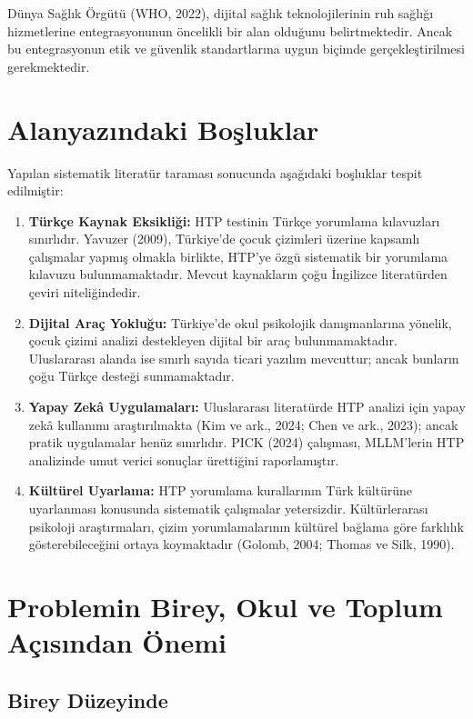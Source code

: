 Dünya Sağlık Örgütü (WHO, 2022), dijital sağlık teknolojilerinin ruh sağlığı hizmetlerine entegrasyonunun öncelikli bir alan olduğunu belirtmektedir. Ancak bu entegrasyonun etik ve güvenlik standartlarına uygun biçimde gerçekleştirilmesi gerekmektedir.

\section{Alanyazındaki Boşluklar}

Yapılan sistematik literatür taraması sonucunda aşağıdaki boşluklar tespit edilmiştir:

\begin{enumerate}
  \item \textbf{Türkçe Kaynak Eksikliği:} HTP testinin Türkçe yorumlama kılavuzları sınırlıdır. Yavuzer (2009), Türkiye'de çocuk çizimleri üzerine kapsamlı çalışmalar yapmış olmakla birlikte, HTP'ye özgü sistematik bir yorumlama kılavuzu bulunmamaktadır. Mevcut kaynakların çoğu İngilizce literatürden çeviri niteliğindedir.

  \item \textbf{Dijital Araç Yokluğu:} Türkiye'de okul psikolojik danışmanlarına yönelik, çocuk çizimi analizi destekleyen dijital bir araç bulunmamaktadır. Uluslararası alanda ise sınırlı sayıda ticari yazılım mevcuttur; ancak bunların çoğu Türkçe desteği sunmamaktadır.

  \item \textbf{Yapay Zekâ Uygulamaları:} Uluslararası literatürde HTP analizi için yapay zekâ kullanımı araştırılmakta (Kim ve ark., 2024; Chen ve ark., 2023); ancak pratik uygulamalar henüz sınırlıdır. PICK (2024) çalışması, MLLM'lerin HTP analizinde umut verici sonuçlar ürettiğini raporlamıştır.

  \item \textbf{Kültürel Uyarlama:} HTP yorumlama kurallarının Türk kültürüne uyarlanması konusunda sistematik çalışmalar yetersizdir. Kültürlerarası psikoloji araştırmaları, çizim yorumlamalarının kültürel bağlama göre farklılık gösterebileceğini ortaya koymaktadır (Golomb, 2004; Thomas ve Silk, 1990).
\end{enumerate}

\section{Problemin Birey, Okul ve Toplum Açısından Önemi}

\subsection{Birey Düzeyinde}

